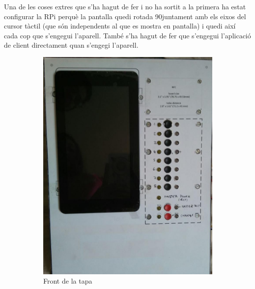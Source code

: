 Una de les coses extres que s'ha hagut de fer i no ha sortit a la primera ha estat configurar la RPi perquè la pantalla quedi rotada\autocite{screen-rotation} 90\degree juntament amb els eixos del cursor tàctil\autocite{touch-rotation} (que són independents al que es mostra en pantalla) i quedi així cada cop que s'engegui l'aparell. També s'ha hagut de fer que s'engegui l'aplicació de client directament quan s'engegi l'aparell.
\newpage
\begin{figure}[H]
	\centering
	\begin{subfigure}[b]{0.45\textwidth}
		\includegraphics[width=\textwidth]{images/demonstrator_front}
		\caption{Front de la tapa}
		\label{fig:test-top-front}
	\end{subfigure}
	\hspace{0.5cm}
	\begin{subfigure}[b]{0.50\textwidth}

\end{subfigure}
\end{figure}
